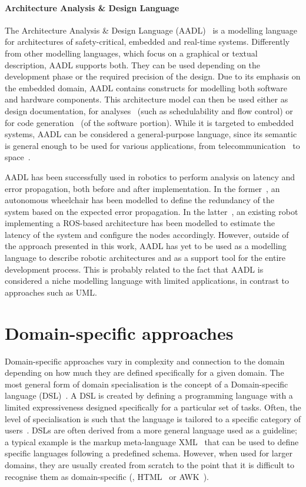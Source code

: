\paragraph{Architecture Analysis \& Design Language} The  Architecture Analysis \& Design Language (AADL)~\cite{feiler2006architecture} is a modelling language for architectures of safety-critical, embedded and real-time systems. Differently from other modelling languages, which focus on a graphical or textual description, AADL supports both. They can be used depending on the development phase or the required precision of the design. Due to its emphasis on the embedded domain, AADL contains constructs for modelling both software and hardware components. This architecture model can then be used either as design documentation, for analyses~\cite{feiler2004open} (such as schedulability and flow control) or for code generation~\cite{hugues2008prototype} (of the software portion). While it is targeted to embedded systems, AADL can be considered a general-purpose language, since its semantic is general enough to be used for various applications, from telecommunication~\cite{delanote2008using} to space~\cite{perrotin2011taste}.

AADL has been successfully used in robotics to perform analysis on latency and error propagation, both before and after implementation. In the former~\cite{biggs2014modelling}, an autonomous wheelchair has been modelled to define the redundancy of the system based on the expected error propagation. In the latter~\cite{larsen2016modelling}, an existing robot implementing a ROS-based architecture has been modelled to estimate the latency of the system and configure the nodes accordingly. However, outside of the approach presented in this work, AADL has yet to be used as a modelling language to describe robotic architectures and as a support tool for the entire development process. This is probably related to the fact that AADL is considered a niche modelling language with limited applications, in contrast to approaches such as UML.

\section{Domain-specific approaches}
Domain-specific approaches vary in complexity and connection to the domain depending on how much they are defined specifically for a given domain. The most general form of domain specialisation is the concept of a Domain-specific language (DSL)~\cite{fowler2010domain}.  A DSL is created by defining a programming language with a limited expressiveness designed specifically for a particular set of tasks. Often, the level of specialisation is such that the language is tailored to a specific category of users~\cite{voelter2013dsl}. DSLs are often derived from a more general language used as a guideline; a typical example is the markup meta-language XML~\cite{harold1998xml} that can be used to define specific languages following a predefined schema. However, when used for larger domains, they are usually created from scratch to the point that it is difficult to recognise them as domain-specific (\eg, HTML~\cite{graham1995html} or AWK~\cite{dougherty1997sed}).

